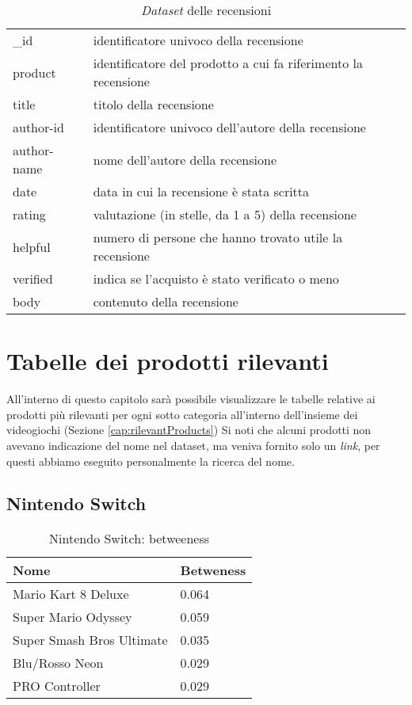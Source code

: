		\begin{table}[H]
		\caption{\textit{Dataset} delle recensioni}
		\label{tab:recensioni}
		\centering
		\begin{tabular}{ll}
			\toprule 
			\_id  & identificatore univoco della recensione\\
			product  & identificatore del prodotto a cui fa riferimento la recensione \\
			title  & titolo della recensione\\
			author-id  & identificatore univoco dell'autore della recensione \\
			author-name  & nome dell'autore della recensione \\
			date  & data in cui la recensione è stata scritta \\
			rating  & valutazione (in stelle, da 1 a 5) della recensione \\
			helpful  & numero di persone che hanno trovato utile la recensione \\
			verified  & indica se l'acquisto è stato verificato o meno \\
			body  & contenuto della recensione \\
			\bottomrule
		\end{tabular}
	\end{table}



	
	\section{Tabelle dei prodotti rilevanti}	
		All'interno di questo capitolo sarà possibile visualizzare le tabelle relative ai prodotti più rilevanti per ogni sotto categoria all'interno dell'insieme dei videogiochi (Sezione \ref{cap:rilevantProducts}) Si noti che alcuni prodotti non avevano indicazione del nome nel dataset, ma veniva fornito solo un \textit{link}, per questi abbiamo eseguito personalmente la ricerca del nome.
		
		\subsection{Nintendo Switch}
			\begin{table}[H]
				\caption{Nintendo Switch: betweeness}
				\label{tab:nintendoswitch}
				\centering
				\begin{tabular}{ll}
					\toprule 
					\textbf{Nome} & \textbf{Betweness} \\
					\midrule
					Mario Kart 8 Deluxe  & 0.064 \\
					Super Mario Odyssey  & 0.059 \\
					Super Smash Bros Ultimate  & 0.035 \\
					Blu/Rosso Neon  & 0.029 \\
					PRO Controller  & 0.029 \\		
					\bottomrule
				\end{tabular}
			\end{table}
		
